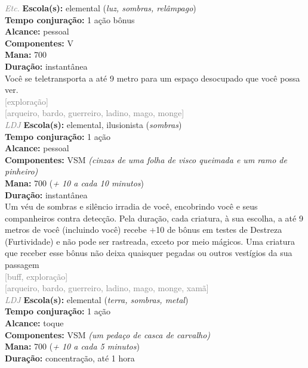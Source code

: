 \documentclass{RPG_Adventure}[2021/10/20]
\begin{document}
{\tiny \textcolor{gray}{\textit{Etc.}}}\jump{}
{\small \t \textbf{Escola(s):} elemental (\textit{luz, sombras, relâmpago})\\\t \textbf{Tempo conjuração:} 1 ação bônus\\\t \textbf{Alcance:} pessoal\\\t \textbf{Componentes:} V\\\t \textbf{Mana:} 700\\\t \textbf{Duração:} instantânea\\}
{\normalsize Você se teletransporta a até 9 metro para um espaço desocupado que você possa ver.\\}
{\scriptsize \textcolor{gray}{[exploração]\\}}
{\scriptsize \textcolor{gray}{[arqueiro, bardo, guerreiro, ladino, mago, monge]\\}}
{\tiny \textcolor{gray}{\textit{LDJ}}}\jump{}
{\small \t \textbf{Escola(s):} elemental, ilusionista (\textit{sombras})\\\t \textbf{Tempo conjuração:} 1 ação\\\t \textbf{Alcance:} pessoal\\\t \textbf{Componentes:} VSM \textit{(cinzas de uma folha de visco queimada e um ramo de pinheiro)}\\\t \textbf{Mana:} 700 (\textit{+ 10 a cada 10 minutos})\\\t \textbf{Duração:} instantânea\\}
{\normalsize Um véu de sombras e silêncio irradia de você, encobrindo você e seus companheiros contra detecção. Pela duração, cada criatura, à sua escolha, a até 9 metros de você (incluindo você) recebe +10 de bônus em testes de Destreza (Furtividade) e não pode ser rastreada, exceto por meio mágicos. Uma criatura que receber esse bônus não deixa quaisquer pegadas ou outros vestígios da sua passagem\\}
{\scriptsize \textcolor{gray}{[buff, exploração]\\}}
{\scriptsize \textcolor{gray}{[arqueiro, bardo, guerreiro, ladino, mago, monge, xamã]\\}}
{\tiny \textcolor{gray}{\textit{LDJ}}}\jump{}
{\small \t \textbf{Escola(s):} elemental (\textit{terra, sombras, metal})\\\t \textbf{Tempo conjuração:} 1 ação\\\t \textbf{Alcance:} toque\\\t \textbf{Componentes:} VSM \textit{(um pedaço de casca de carvalho)}\\\t \textbf{Mana:} 700 (\textit{+ 10 a cada 5 minutos})\\\t \textbf{Duração:} concentração, até 1 hora\\}
\end{document}
